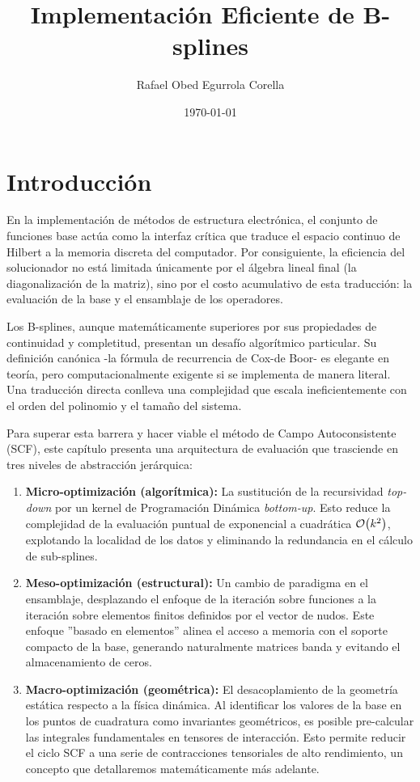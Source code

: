 \documentclass[12pt, a4paper, oneside, spanish]{article}
\title{\textbf{Implementación Eficiente de B-splines}}
\author{Rafael Obed Egurrola Corella}
\date{\today}
\begin{document}
\section{Introducción}

En la implementación de métodos de estructura electrónica, el conjunto de funciones base actúa como la interfaz crítica que traduce el espacio continuo de Hilbert a la memoria discreta del computador. Por consiguiente, la eficiencia del solucionador no está limitada únicamente por el álgebra lineal final (la diagonalización de la matriz), sino por el costo acumulativo de esta traducción: la evaluación de la base y el ensamblaje de los operadores.

Los B-splines, aunque matemáticamente superiores por sus propiedades de continuidad y completitud, presentan un desafío algorítmico particular. Su definición canónica -la fórmula de recurrencia de Cox-de Boor- es elegante en teoría, pero computacionalmente exigente si se implementa de manera literal. Una traducción directa conlleva una complejidad que escala ineficientemente con el orden del polinomio y el tamaño del sistema.

Para superar esta barrera y hacer viable el método de Campo Autoconsistente (SCF), este capítulo presenta una arquitectura de evaluación que trasciende en tres niveles de abstracción jerárquica:

\begin{enumerate}
\item \textbf{Micro-optimización (algorítmica):} La sustitución de la recursividad \textit{top-down} por un kernel de Programación Dinámica \textit{bottom-up}. Esto reduce la complejidad de la evaluación puntual de exponencial a cuadrática \( \order{k^2} \), explotando la localidad de los datos y eliminando la redundancia en el cálculo de sub-splines.
\item \textbf{Meso-optimización (estructural):} Un cambio de paradigma en el ensamblaje, desplazando el enfoque de la iteración sobre funciones a la iteración sobre elementos finitos definidos por el vector de nudos. Este enfoque ”basado en elementos” alinea el acceso a memoria con el soporte compacto de la base, generando naturalmente matrices banda y evitando el almacenamiento de ceros.
\item \textbf{Macro-optimización (geométrica):} El desacoplamiento de la geometría estática respecto a la física dinámica. Al identificar los valores de la base en los puntos de cuadratura como invariantes geométricos, es posible pre-calcular las integrales fundamentales en tensores de interacción. Esto permite reducir el ciclo SCF a una serie de contracciones tensoriales de alto rendimiento, un concepto que detallaremos matemáticamente más adelante.
\end{enumerate}
\end{document}

